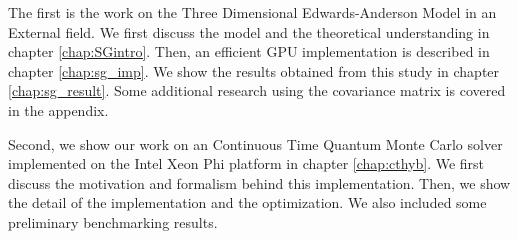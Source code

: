 The first is the work on the Three Dimensional Edwards-Anderson Model in an External
field. We first discuss the model and the theoretical understanding in chapter 
\ref{chap:SGintro}. Then, an efficient GPU implementation is described in chapter
\ref{chap:sg_imp}. We show the results obtained from this study in chapter \ref{chap:sg_result}.
Some additional research using the covariance matrix is covered in the appendix.

Second, we show our work on an Continuous Time Quantum Monte Carlo solver implemented
on the Intel Xeon Phi platform in chapter \ref{chap:cthyb}. We first discuss the 
motivation and formalism behind this implementation. Then, we show the detail of
the implementation and the optimization. We also included some preliminary benchmarking
results.



